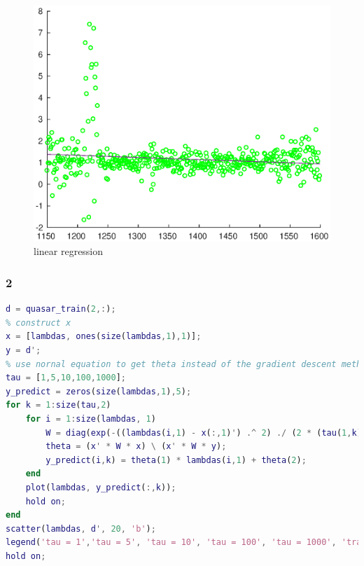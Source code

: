 \documentclass{ctexart}
\begin{document}
\begin{figure}[ht]
	\includegraphics[width = \textwidth]{linear_regression.eps}
	\caption{linear regression}
	\label{logistic}
\end{figure}

\subsubsection{2}

\begin{lstlisting}[language = MATLAB]
d = quasar_train(2,:);
% construct x 
x = [lambdas, ones(size(lambdas,1),1)];
y = d';
% use nornal equation to get theta instead of the gradient descent method
tau = [1,5,10,100,1000];
y_predict = zeros(size(lambdas,1),5);
for k = 1:size(tau,2)
	for i = 1:size(lambdas, 1)
		W = diag(exp(-((lambdas(i,1) - x(:,1)') .^ 2) ./ (2 * (tau(1,k) ^ 2))));
		theta = (x' * W * x) \ (x' * W * y);
		y_predict(i,k) = theta(1) * lambdas(i,1) + theta(2);
	end
	plot(lambdas, y_predict(:,k));
	hold on;
end
scatter(lambdas, d', 20, 'b');
legend('tau = 1','tau = 5', 'tau = 10', 'tau = 100', 'tau = 1000', 'train data');
hold on;
\end{lstlisting}
\end{document}
